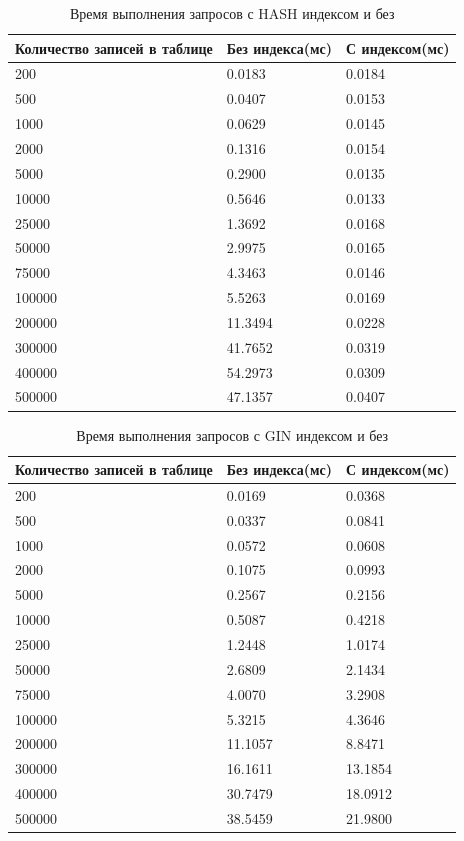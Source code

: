 \begin{table}[H]
	\centering
	\caption{Время выполнения запросов с HASH индексом и без}
	\begin{tabular}{|p{5cm}|p{5cm}|p{5cm}|}
	\hline
	Количество записей в таблице & Без индекса(мс) & С индексом(мс) \\
	\hline
	200 & 0.0183 & 0.0184 \\
	\hline
	500 & 0.0407 & 0.0153 \\
	\hline
	1000 & 0.0629 & 0.0145 \\
	\hline
	2000 & 0.1316 & 0.0154 \\
	\hline
	5000 & 0.2900 & 0.0135 \\
	\hline
	10000 & 0.5646 & 0.0133 \\
	\hline
	25000 & 1.3692 & 0.0168 \\
	\hline
	50000 & 2.9975 & 0.0165 \\
	\hline
	75000 & 4.3463 & 0.0146 \\
	\hline
	100000 & 5.5263 & 0.0169 \\
	\hline
	200000 & 11.3494 & 0.0228 \\
	\hline
	300000 & 41.7652 & 0.0319 \\
	\hline
	400000 & 54.2973 & 0.0309 \\
	\hline
	500000 & 47.1357 & 0.0407 \\
	\hline
	\end{tabular}
	\label{tab:res_hash_exe}
\end{table}

\begin{table}[H]
	\centering
	\caption{Время выполнения запросов с GIN индексом и без}
	\begin{tabular}{|p{5cm}|p{5cm}|p{5cm}|}
	\hline
	Количество записей в таблице & Без индекса(мс) & С индексом(мс) \\
	\hline
	200 & 0.0169 & 0.0368 \\
	\hline
	500 & 0.0337 & 0.0841 \\
	\hline
	1000 & 0.0572 & 0.0608 \\
	\hline
	2000 & 0.1075 & 0.0993 \\
	\hline
	5000 & 0.2567 & 0.2156 \\
	\hline
	10000 & 0.5087 & 0.4218 \\
	\hline
	25000 & 1.2448 & 1.0174 \\
	\hline
	50000 & 2.6809 & 2.1434 \\
	\hline
	75000 & 4.0070 & 3.2908 \\
	\hline
	100000 & 5.3215 & 4.3646 \\
	\hline
	200000 & 11.1057 & 8.8471 \\
	\hline
	300000 & 16.1611 & 13.1854 \\
	\hline
	400000 & 30.7479 & 18.0912 \\
	\hline
	500000 & 38.5459 & 21.9800 \\
	\hline
	\end{tabular}
	\label{tab:res_gin_exe}
\end{table}

